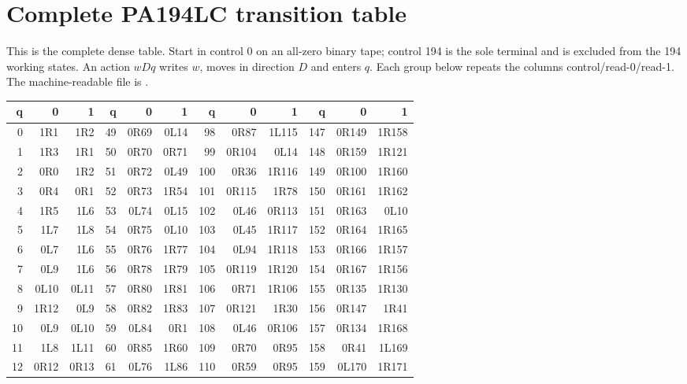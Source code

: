 \section{Complete PA194LC transition table}
\label{app:lc-table}
This is the complete dense table. Start in control 0 on an all-zero
binary tape; control 194 is the sole terminal and is excluded from the
194 working states. An action $wDq$ writes $w$, moves in direction $D$
and enters $q$. Each group below repeats the columns control/read-0/read-1.
The machine-readable file is .

\begin{center}
\scriptsize\ttfamily
\setlength{\tabcolsep}{5pt}
\renewcommand{\arraystretch}{1.15}
\begin{tabular}{@{}rrr@{\hspace{11pt}}rrr@{\hspace{11pt}}rrr@{\hspace{11pt}}rrr@{}}
\toprule
q & 0 & 1 & q & 0 & 1 & q & 0 & 1 & q & 0 & 1 \\
\midrule
0 & 1R1 & 1R2 & 49 & 0R69 & 0L14 & 98 & 0R87 & 1L115 & 147 & 0R149 & 1R158 \\
1 & 1R3 & 1R1 & 50 & 0R70 & 0R71 & 99 & 0R104 & 0L14 & 148 & 0R159 & 1R121 \\
2 & 0R0 & 1R2 & 51 & 0R72 & 0L49 & 100 & 0R36 & 1R116 & 149 & 0R100 & 1R160 \\
3 & 0R4 & 0R1 & 52 & 0R73 & 1R54 & 101 & 0R115 & 1R78 & 150 & 0R161 & 1R162 \\
4 & 1R5 & 1L6 & 53 & 0L74 & 0L15 & 102 & 0L46 & 0R113 & 151 & 0R163 & 0L10 \\
5 & 1L7 & 1L8 & 54 & 0R75 & 0L10 & 103 & 0L45 & 1R117 & 152 & 0R164 & 1R165 \\
6 & 0L7 & 1L6 & 55 & 0R76 & 1R77 & 104 & 0L94 & 1R118 & 153 & 0R166 & 1R157 \\
7 & 0L9 & 1L6 & 56 & 0R78 & 1R79 & 105 & 0R119 & 1R120 & 154 & 0R167 & 1R156 \\
8 & 0L10 & 0L11 & 57 & 0R80 & 1R81 & 106 & 0R71 & 1R106 & 155 & 0R135 & 1R130 \\
9 & 1R12 & 0L9 & 58 & 0R82 & 1R83 & 107 & 0R121 & 1R30 & 156 & 0R147 & 1R41 \\
10 & 0L9 & 0L10 & 59 & 0L84 & 0R1 & 108 & 0L46 & 0R106 & 157 & 0R134 & 1R168 \\
11 & 1L8 & 1L11 & 60 & 0R85 & 1R60 & 109 & 0R70 & 0R95 & 158 & 0R41 & 1L169 \\
12 & 0R12 & 0R13 & 61 & 0L76 & 1L86 & 110 & 0R59 & 0R95 & 159 & 0L170 & 1R171 \\

\end{tabular}
\end{center}
